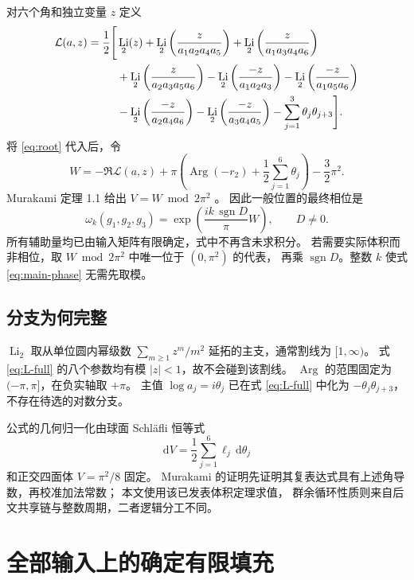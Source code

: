 \documentclass[UTF8,11pt,fontset=none]{ctexart}
\numberwithin{equation}{section}
\theoremstyle{definition}
\DeclareMathOperator{\Li}{Li}
\DeclareMathOperator{\Arg}{Arg}
\DeclareMathOperator{\sgn}{sgn}
\newcommand{\dd}{\mathrm d}
\begin{document}
对六个角和独立变量 $z$ 定义
\begin{align}
 \mathcal L(a,z)=\frac12\Bigg[&
 \Li_2(z)
 +\Li_2\left(\frac{z}{a_1a_2a_4a_5}\right)
 +\Li_2\left(\frac{z}{a_1a_3a_4a_6}\right)\notag\\
 &+\Li_2\left(\frac{z}{a_2a_3a_5a_6}\right)
 -\Li_2\left(\frac{-z}{a_1a_2a_3}\right)
 -\Li_2\left(\frac{-z}{a_1a_5a_6}\right)\notag\\
 &-\Li_2\left(\frac{-z}{a_2a_4a_6}\right)
 -\Li_2\left(\frac{-z}{a_3a_4a_5}\right)
 -\sum_{j=1}^3\theta_j\theta_{j+3}\Bigg].
 \label{eq:L-full}
\end{align}
将 \eqref{eq:root} 代入后，令
\begin{equation}
 W=-\Re\mathcal L(a,z)
 +\pi\left(\Arg(-r_2)+\frac12\sum_{j=1}^6\theta_j\right)
 -\frac32\pi^2.
 \label{eq:W}
\end{equation}
Murakami 定理 1.1 给出 $V=W\bmod 2\pi^2$ \cite{murakami}。
因此一般位置的最终相位是
\begin{equation}
 \boxed{\qquad
 \omega_k(g_1,g_2,g_3)
 =\exp\left(\frac{ik\,\sgn D}{\pi}W\right),
 \qquad D\ne0.
 \qquad}
 \label{eq:main-phase}
\end{equation}
所有辅助量均已由输入矩阵有限确定，式中不再含未求积分。
若需要实际体积而非相位，取 $W\bmod2\pi^2$ 中唯一位于 $(0,\pi^2)$ 的代表，
再乘 $\sgn D$。整数 $k$ 使式 \eqref{eq:main-phase} 无需先取模。

\subsection{分支为何完整}

$\Li_2$ 取从单位圆内幂级数
$\sum_{m\ge1}z^m/m^2$ 延拓的主支，通常割线为 $[1,\infty)$。
式 \eqref{eq:L-full} 的八个参数均有模 $|z|<1$，故不会碰到该割线。
$\Arg$ 的范围固定为 $(-\pi,\pi]$，在负实轴取 $+\pi$。
主值 $\log a_j=i\theta_j$ 已在式 \eqref{eq:L-full} 中化为
$-\theta_j\theta_{j+3}$，不存在待选的对数分支。

公式的几何归一化由球面 Schläfli 恒等式
\begin{equation}
 \dd V=\frac12\sum_{j=1}^6\ell_j\,\dd\theta_j
 \label{eq:schlafli}
\end{equation}
和正交四面体 $V=\pi^2/8$ 固定。
Murakami 的证明先证明其复表达式具有上述角导数，再校准加法常数；
本文使用该已发表体积定理求值，
群余循环性质则来自后文共享链与整数周期，二者逻辑分工不同。

\section{全部输入上的确定有限填充}\label{sec:global}
\end{document}
